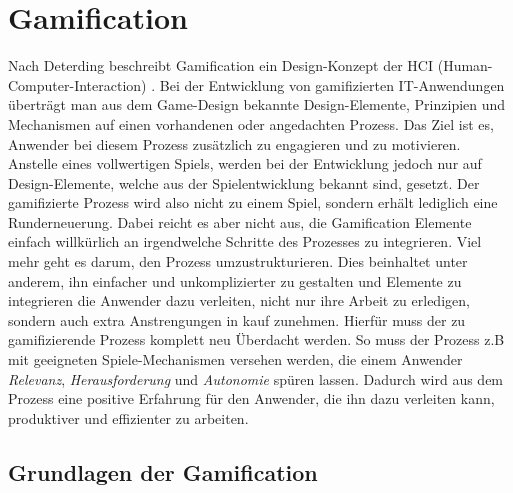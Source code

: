 \documentclass[a4paper,12pt]{scrartcl}
\begin{document}
\section{Gamification}
Nach Deterding beschreibt Gamification ein Design-Konzept der HCI (Human-Computer-Interaction) \cite{Deterding2011}. Bei der Entwicklung von gamifizierten IT-Anwendungen überträgt man aus dem Game-Design bekannte Design-Elemente, Prinzipien und Mechanismen auf einen vorhandenen oder angedachten Prozess. Das Ziel ist es, Anwender bei diesem Prozess zusätzlich zu engagieren und zu motivieren. Anstelle eines vollwertigen Spiels, werden bei der Entwicklung jedoch nur auf Design-Elemente, welche aus der Spielentwicklung bekannt sind, gesetzt. Der gamifizierte Prozess wird also nicht zu einem Spiel, sondern erhält lediglich eine Runderneuerung. Dabei reicht es aber nicht aus, die Gamification Elemente einfach willkürlich an irgendwelche Schritte des Prozesses zu integrieren. Viel mehr geht es darum, den Prozess umzustrukturieren. Dies beinhaltet unter anderem, ihn einfacher und unkomplizierter zu gestalten und Elemente zu integrieren die Anwender dazu verleiten, nicht nur ihre Arbeit zu erledigen, sondern auch extra Anstrengungen in kauf zunehmen. Hierfür muss der zu gamifizierende Prozess komplett neu Überdacht werden. So muss der Prozess z.B mit geeigneten  Spiele-Mechanismen versehen werden, die einem Anwender \textit{Relevanz}, \textit{Herausforderung} und \textit{Autonomie} spüren lassen. Dadurch wird aus dem Prozess eine positive Erfahrung für den Anwender, die ihn dazu verleiten kann, produktiver und effizienter zu arbeiten.

\subsection{Grundlagen der Gamification}
\end{document}
